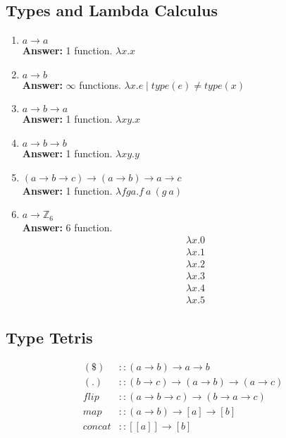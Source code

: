 \documentclass{article}
\begin{document}
\subsection{Types and Lambda Calculus}
\begin{enumerate}
	\item $a \rightarrow a$\\
		\textbf{Answer:} 1 function. $\lambda x.x$

	\item $a \rightarrow b$\\
		\textbf{Answer:} $\infty$ functions. $\lambda x.e \mid type(e)\neq type(x)$

	\item $a \rightarrow b \rightarrow a$\\
		\textbf{Answer:} 1 function. $\lambda xy.x$

	\item $a \rightarrow b \rightarrow b$\\
		\textbf{Answer:} 1 function. $\lambda xy.y$

	\item $(a \rightarrow b \rightarrow c) \rightarrow (a \rightarrow b)
		\rightarrow a \rightarrow c$\\
		\textbf{Answer:} 1 function. $\lambda fga.f\ a\ (g\ a)$

	\item $a \rightarrow \mathbb{Z}_6$\\
		\textbf{Answer:} 6 function. 
		\begin{align*}
			&\lambda x.0\\
			&\lambda x.1\\
			&\lambda x.2\\
			&\lambda x.3\\
			&\lambda x.4\\
			&\lambda x.5
		\end{align*}

\end{enumerate}

\subsection{Type Tetris}

\begin{align*}
	(\$)&::(a\rightarrow b) \rightarrow a \rightarrow b\\
	(.)&::(b\rightarrow c) \rightarrow (a \rightarrow b) \rightarrow (a \rightarrow c)\\
	flip&::(a\rightarrow b \rightarrow c) \rightarrow (b\rightarrow a \rightarrow c)\\
	map&::(a\rightarrow b) \rightarrow [a] \rightarrow [b]\\
	concat&::[[a]] \rightarrow [b]
\end{align*}
\end{document}
